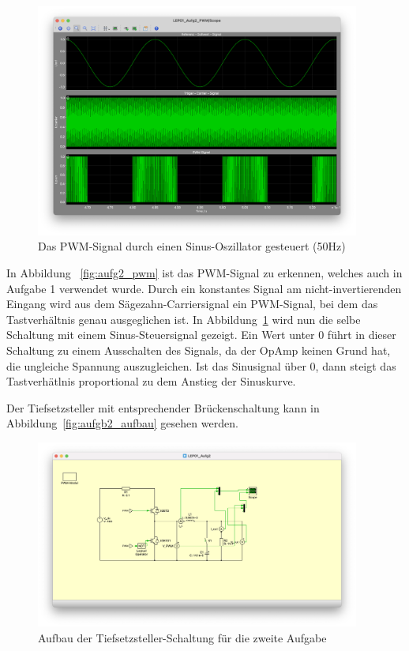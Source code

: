\documentclass{report}
\begin{document}
\begin{figure}[h]
  \begin{center}
    \includegraphics[width=0.95\textwidth]{assets/img/aufg2_pwm_sin.png}
  \end{center}
  \caption{Das PWM-Signal durch einen Sinus-Oszillator gesteuert (50Hz)}
  \label{fig:aufg2_pwm_sin}
\end{figure}

In Abbildung ~\ref{fig:aufg2_pwm} ist das PWM-Signal zu erkennen, welches auch in Aufgabe 1 verwendet wurde. Durch ein konstantes Signal am nicht-invertierenden Eingang wird aus dem Sägezahn-Carriersignal ein PWM-Signal, bei dem das Tastverhältnis genau ausgeglichen ist.
In Abbildung~\ref{fig:aufg2_pwm_sin} wird nun die selbe Schaltung mit einem Sinus-Steuersignal gezeigt. Ein Wert unter 0 führt in dieser Schaltung zu einem Ausschalten des Signals, da der OpAmp keinen Grund hat, die ungleiche Spannung auszugleichen. Ist das Sinusignal über 0, dann steigt das Tastverhätlnis proportional zu dem Anstieg der Sinuskurve. 

Der Tiefsetzsteller mit entsprechender Brückenschaltung kann in Abbildung~\ref{fig:aufgb2_aufbau} gesehen werden.

\begin{figure}[h]
  \begin{center}
    \includegraphics[width=0.95\textwidth]{assets/img/aufg2_aufbau.png}
  \end{center}
  \caption{Aufbau der Tiefsetzsteller-Schaltung für die zweite Aufgabe}
  \label{fig:aufg2_aufbau}
\end{figure}
\end{document}
